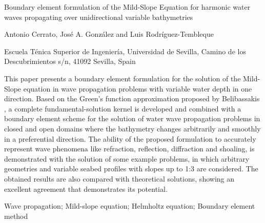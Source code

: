 \begin{titlepaper}
Boundary element formulation of the Mild-Slope Equation for harmonic water waves propagating over unidirectional variable bathymetries
\end{titlepaper}

\begin{authorpaper}
Antonio Cerrato, José A. González and Luis Rodríguez-Tembleque
\end{authorpaper}

\begin{affiliation}
Escuela Ténica Superior de Ingeniería, Universidad de Sevilla, Camino de los Descubrimientos s/n, 41092 Sevilla, Spain
\end{affiliation}

%
%
%


\begin{chapabstract}
This paper presents a boundary element formulation for the solution of the Mild-Slope equation in wave propagation problems with variable water depth in one direction. Based on the Green's function approximation proposed by Belibassakis \cite{Belibassakis2000}, a complete fundamental-solution kernel is developed and combined with a boundary element scheme for the solution of water wave propagation problems in closed and open domains where the bathymetry changes arbitrarily and smoothly in a preferential direction. The ability of the proposed formulation to accurately represent wave phenomena like refraction, reflection, diffraction and shoaling, is demonstrated with the solution of some example problems, in which arbitrary geometries and variable seabed profiles with slopes up to 1:3 are considered. The obtained results are also compared with theoretical solutions, showing an excellent agreement that demonstrates its potential.
\end{chapabstract}

\begin{keywordspaper}
Wave propagation; Mild-slope equation; Helmholtz equation; Boundary element method
\end{keywordspaper}


